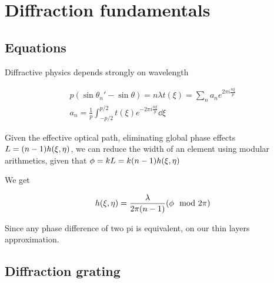 \documentclass[../main/main.tex]{subfiles}
\begin{document}
\chapter{Diffraction fundamentals}

\section{Equations}

Diffractive physics depends strongly on wavelength

\begin{align*}
p (\sin \theta_{n}' - \sin \theta) = n \lambda
t(\xi) = \sum_{n} a_{n} e ^{2 \pi i \frac {n \xi} p }\\
a_{n} = \frac 1 p \int_{-p/2}^{p/2} t (\xi) e ^{-2 \pi i \frac {n \xi} p } \dd \xi
\end{align*}

Given the effective optical path, eliminating global phase effects $L = (n - 1) h(\xi, \eta)$, we can reduce the width of an element using modular arithmetics,  given that $\phi = k L = k(n - 1) h(\xi, \eta)$

We get

\begin{equation}
h(\xi, \eta) = \frac{\lambda}{2\pi (n-1)} \qty(\phi \mod 2 \pi)
\end{equation}

Since any phase difference of two pi is equivalent, on our thin layers approximation.



\section{Diffraction grating}
\end{document}
